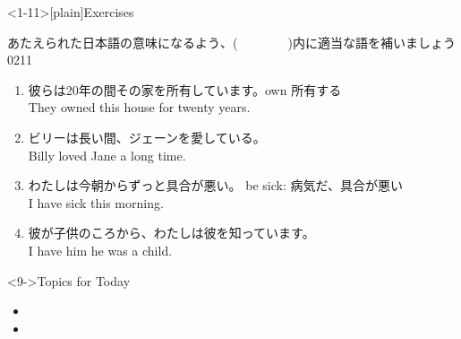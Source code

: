 \documentclass[aspectratio=169,xcolor={dvipsnames,table}]{beamer}
\newcommand{\myaudio}[1]{\href{#1}{\faVolumeUp}}
\begin{document}
\begin{frame}<1-11>[plain]{Exercises}

{\small あたえられた日本語の意味になるよう、(~~~~~~~~)内に適当な語を補いましょ}う%
\hfill{\tiny 0211}\,{\scriptsize \myaudio{./audio/012_have_pp_keizoku_051.mp3}}

\begin{enumerate}
 \item {\small 彼らは20年の間その家を所有しています。}\hfill{}{\scriptsize own  所有する}\\
They  owned this house for twenty years.%
       \hfill{}
 \item {\small ビリーは長い間、ジェーンを愛している。}\\%
Billy  loved Jane  a long time.
 \item {\small わたしは今朝からずっと具合が悪い。}%
       \hfill{}{\scriptsize be sick: 病気だ、具合が悪い}\\
I have  sick  this morning.%
       \hfill{}
 \item {\small 彼が子供のころから、わたしは彼を知っています。}\\
I have  him  he was a child.%
       \hfill{}
\end{enumerate}

\begin{block}<9->{Topics for Today}\small
\begin{itemize}[square]
 \item {}
 \item {}
\end{itemize}
      \end{block}
\end{frame}
\end{document}
